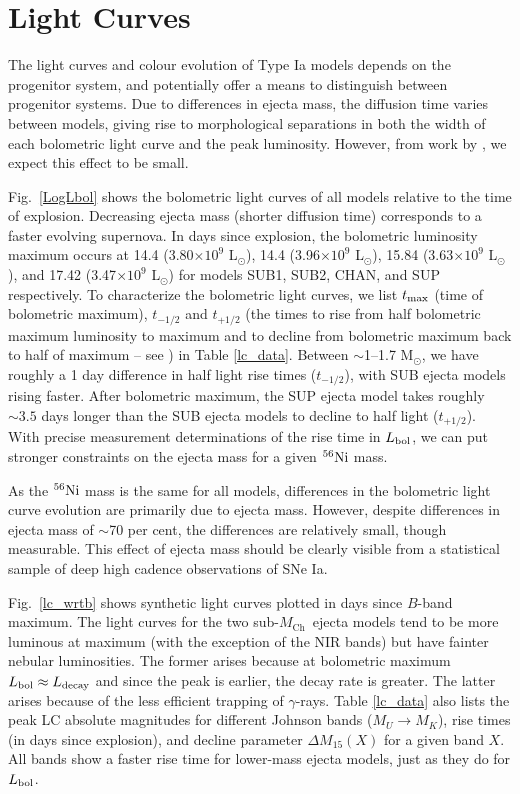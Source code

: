 \documentclass[useAMS,usenatbib,useasmath]{mnras}
\newcommand{\Mch}{\hbox{$M_{\text{Ch}}$}}
\newcommand{\Lsun}{\hbox{L$_\odot$}}
\newcommand{\Msun}{\hbox{M$_\odot$}}
\newcommand{\elem}[2][default]{$^{#1}{\rm #2}$}
\def\grays{$\gamma$-rays}
\def\fig{Fig.}
\begin{document}
\section{Light Curves}%
\label{section_lc}
The light curves and colour evolution of Type Ia models depends on the progenitor system, and potentially offer a means to distinguish between progenitor systems. Due to differences in ejecta mass, the diffusion time varies between models, giving rise to morphological separations in both the width of each bolometric light curve and the peak luminosity. However, from work by \cite{Pinto_Eastman2000a,Pinto_Eastman2000b}, we expect this effect to be small.

\fig~\ref{LogLbol} shows the bolometric light curves of all models relative to the time of explosion. Decreasing ejecta mass (shorter diffusion time) corresponds to a faster evolving supernova. In days since explosion, the bolometric luminosity maximum occurs at 14.4 (3.80$\times10^9$ \Lsun), 14.4 (3.96$\times10^9$ \Lsun), 15.84 (3.63$\times10^9$ \Lsun), and 17.42 (3.47$\times10^9$ \Lsun) for models SUB1, SUB2, CHAN, and SUP respectively. To characterize the bolometric light curves, we list $t_{\rm max}$ (time of bolometric maximum), $t_{-1/2}$ and $t_{+1/2}$ (the times to rise from half bolometric maximum luminosity to maximum and to decline from bolometric maximum back to half of maximum -- see \cite{Contardo2000}) in Table \ref{lc_data}. Between $\sim$1--1.7 \Msun, we have roughly a 1 day difference in half light rise times ($t_{-1/2}$), with SUB ejecta models rising faster. After bolometric maximum, the SUP ejecta model takes roughly $\sim3.5$ days longer than the SUB ejecta models to decline to half light ($t_{+1/2}$). With precise measurement determinations of the rise time in $L_{\rm bol}$, we can put stronger constraints on the ejecta mass for a given \elem[56]{Ni} mass. 

As the \elem[56]{Ni} mass is the same for all models, differences in the bolometric light curve evolution are primarily due to ejecta mass. However, despite differences in ejecta mass of $\sim$70 per cent, the differences are relatively small, though measurable. This effect of ejecta mass should be clearly visible from a statistical sample of deep high cadence observations of SNe Ia. 

\fig~\ref{lc_wrtb} shows synthetic light curves plotted in days since $B$-band maximum. The light curves for the two sub-\Mch\ ejecta models tend to be more luminous at maximum (with the exception of the NIR bands) but have fainter nebular luminosities. The former arises because at bolometric maximum $L_{\rm bol}\approx L_{\rm decay}$ and since the peak is earlier, the decay rate is greater. The latter arises because of the less efficient trapping of \grays. Table \ref{lc_data} also lists the peak LC absolute magnitudes for different Johnson bands ($M_U\rightarrow M_K$), rise times (in days since explosion), and decline parameter $\Delta M_{15}(X)$ for a given band $X$. %
All bands show a faster rise time for lower-mass ejecta models, just as they do for $L_{\rm bol}$.  
\end{document}
